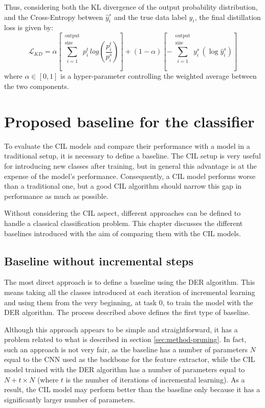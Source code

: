 Thus, considering both the KL divergence of the output probability distribution, and the Cross-Entropy between $\hat{y}_i^s$ and the true data label $y_i$, the final distillation loss is given by:
\begin{equation}
    \mathcal{L}_{KD} = \alpha \left[\sum_{i=1}^{\substack{\text{output}\\\text{size}}} p_i^t \, log \left( \frac{p_i^t}{p_i^s} \right) \right]
    + (1-\alpha) \left[-\sum_{i=1}^{\substack{\text{output}\\\text{size}}} y_i^s \, (\log \hat{y}_i^s) \right]
\end{equation}
where $\alpha \in [0, 1]$ is a hyper-parameter controlling the weighted average between the two components.

\section{Proposed baseline for the classifier}
\label{sec:method-baseline}
To evaluate the CIL models and compare their performance with a model in a traditional setup, it is necessary to define a baseline.
The CIL setup is very useful for introducing new classes after training, but in general this advantage is at the expense of the model's performance. Consequently, a CIL model performs worse than a traditional one, but a good CIL algorithm should narrow this gap in performance as much as possible.

Without considering the CIL aspect, different approaches can be defined to handle a classical classification problem. This chapter discusses the different baselines introduced with the aim of comparing them with the CIL models.

\subsection{Baseline without incremental steps}
\label{sec:method-baseline1}
The most direct approach is to define a baseline using the DER algorithm.
This means taking all the classes introduced at each iteration of incremental learning and using them from the very beginning, at task 0, to train the model with the DER algorithm.
The process described above defines the first type of baseline.

Although this approach appears to be simple and straightforward, it has a problem related to what is described in section \autoref{sec:method-pruning}. In fact, such an approach is not very fair, as the baseline has a number of parameters $N$ equal to the CNN used as the backbone for the feature extractor, while the CIL model trained with the DER algorithm has a number of parameters equal to $N + t \times N$ (where $t$ is the number of iterations of incremental learning).
As a result, the CIL model may perform better than the baseline only because it has a significantly larger number of parameters.

